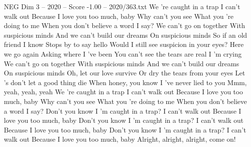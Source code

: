 \begin{textsample}{NEG Dim 3 – 2020 – Score -1.00 – 2020/363.txt}  \label{ex:f3_neg_039}
We 're caught in a trap I can't walk out Because I love you too much, baby Why can't you see What you 're doing to me When you don't believe a word I say?
We can't go on together With suspicious minds And we can't build our dreams On suspicious minds So if an old friend I know Stops by to say hello Would I still see suspicion in your eyes?
Here we go again Asking where I 've been You can't see the tears are real I 'm crying We can't go on together With suspicious minds And we can't build our dreams On suspicious minds Oh, let our love survive Or dry the tears from your eyes Let 's don't let a good thing die When honey, you know I 've never lied to you Mmm, yeah, yeah, yeah We 're caught in a trap I can't walk out Because I love you too much, baby Why can't you see What you 're doing to me When you don't believe a word I say?
Don't you know I 'm caught in a trap?
I can't walk out Because I love you too much, baby Don't you know I 'm caught in a trap?
I can't walk out Because I love you too much, baby Don't you know I 'm caught in a trap?
I can't walk out Because I love you too much, baby Alright, alright, alright, come on!

\end{textsample}
